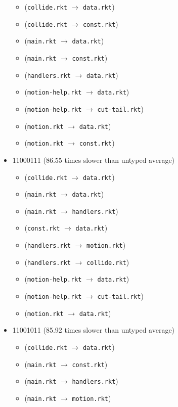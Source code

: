\documentclass{article}
\newcommand{\mono}[1]{\texttt{#1}}
\begin{document}
\begin{itemize}
  \begin{itemize}
  \item (\mono{collide.rkt} $\rightarrow$ \mono{data.rkt})
  \item (\mono{collide.rkt} $\rightarrow$ \mono{const.rkt})
  \item (\mono{main.rkt} $\rightarrow$ \mono{data.rkt})
  \item (\mono{main.rkt} $\rightarrow$ \mono{const.rkt})
  \item (\mono{handlers.rkt} $\rightarrow$ \mono{data.rkt})
  \item (\mono{motion-help.rkt} $\rightarrow$ \mono{data.rkt})
  \item (\mono{motion-help.rkt} $\rightarrow$ \mono{cut-tail.rkt})
  \item (\mono{motion.rkt} $\rightarrow$ \mono{data.rkt})
  \item (\mono{motion.rkt} $\rightarrow$ \mono{const.rkt})
  \end{itemize}
\item 11000111 (86.55 times slower than untyped average)
  \begin{itemize}
  \item (\mono{collide.rkt} $\rightarrow$ \mono{data.rkt})
  \item (\mono{main.rkt} $\rightarrow$ \mono{data.rkt})
  \item (\mono{main.rkt} $\rightarrow$ \mono{handlers.rkt})
  \item (\mono{const.rkt} $\rightarrow$ \mono{data.rkt})
  \item (\mono{handlers.rkt} $\rightarrow$ \mono{motion.rkt})
  \item (\mono{handlers.rkt} $\rightarrow$ \mono{collide.rkt})
  \item (\mono{motion-help.rkt} $\rightarrow$ \mono{data.rkt})
  \item (\mono{motion-help.rkt} $\rightarrow$ \mono{cut-tail.rkt})
  \item (\mono{motion.rkt} $\rightarrow$ \mono{data.rkt})
  \end{itemize}
\item 11001011 (85.92 times slower than untyped average)
  \begin{itemize}
  \item (\mono{collide.rkt} $\rightarrow$ \mono{data.rkt})
  \item (\mono{main.rkt} $\rightarrow$ \mono{const.rkt})
  \item (\mono{main.rkt} $\rightarrow$ \mono{handlers.rkt})
  \item (\mono{main.rkt} $\rightarrow$ \mono{motion.rkt})

\end{itemize}
\end{itemize}
\end{document}
